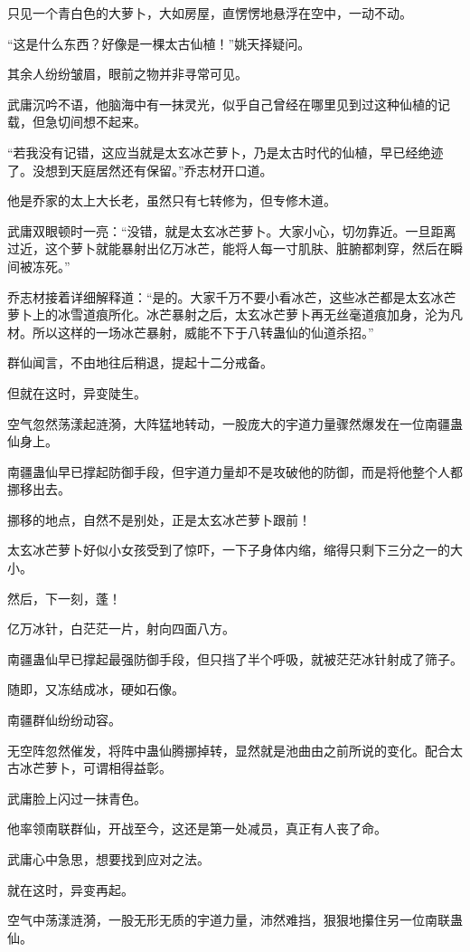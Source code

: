 \begin{this_body}
只见一个青白色的大萝卜，大如房屋，直愣愣地悬浮在空中，一动不动。

“这是什么东西？好像是一棵太古仙植！”姚天择疑问。

其余人纷纷皱眉，眼前之物并非寻常可见。

武庸沉吟不语，他脑海中有一抹灵光，似乎自己曾经在哪里见到过这种仙植的记载，但急切间想不起来。

“若我没有记错，这应当就是太玄冰芒萝卜，乃是太古时代的仙植，早已经绝迹了。没想到天庭居然还有保留。”乔志材开口道。

他是乔家的太上大长老，虽然只有七转修为，但专修木道。

武庸双眼顿时一亮：“没错，就是太玄冰芒萝卜。大家小心，切勿靠近。一旦距离过近，这个萝卜就能暴射出亿万冰芒，能将人每一寸肌肤、脏腑都刺穿，然后在瞬间被冻死。”

乔志材接着详细解释道：“是的。大家千万不要小看冰芒，这些冰芒都是太玄冰芒萝卜上的冰雪道痕所化。冰芒暴射之后，太玄冰芒萝卜再无丝毫道痕加身，沦为凡材。所以这样的一场冰芒暴射，威能不下于八转蛊仙的仙道杀招。”

群仙闻言，不由地往后稍退，提起十二分戒备。

但就在这时，异变陡生。

空气忽然荡漾起涟漪，大阵猛地转动，一股庞大的宇道力量骤然爆发在一位南疆蛊仙身上。

南疆蛊仙早已撑起防御手段，但宇道力量却不是攻破他的防御，而是将他整个人都挪移出去。

挪移的地点，自然不是别处，正是太玄冰芒萝卜跟前！

太玄冰芒萝卜好似小女孩受到了惊吓，一下子身体内缩，缩得只剩下三分之一的大小。

然后，下一刻，蓬！

亿万冰针，白茫茫一片，射向四面八方。

南疆蛊仙早已撑起最强防御手段，但只挡了半个呼吸，就被茫茫冰针射成了筛子。

随即，又冻结成冰，硬如石像。

南疆群仙纷纷动容。

无空阵忽然催发，将阵中蛊仙腾挪掉转，显然就是池曲由之前所说的变化。配合太古冰芒萝卜，可谓相得益彰。

武庸脸上闪过一抹青色。

他率领南联群仙，开战至今，这还是第一处减员，真正有人丧了命。

武庸心中急思，想要找到应对之法。

就在这时，异变再起。

空气中荡漾涟漪，一股无形无质的宇道力量，沛然难挡，狠狠地攥住另一位南联蛊仙。


\end{this_body}

